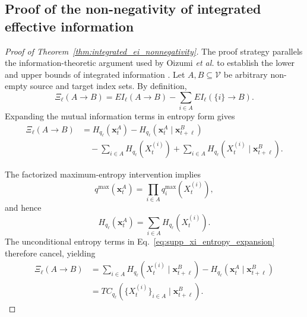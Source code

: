 \subsection{Proof of the non-negativity of integrated effective information}
\label{app:proof_integrated_ei_nonnegativity}

\begin{proof}[Proof of Theorem~\ref{thm:integrated_ei_nonnegativity}]

The proof strategy parallels the information-theoretic argument used by
Oizumi \emph{et al.} to establish the lower and upper bounds of integrated
information \cite{Oizumi2016MeasuringII}. Let \(A,B\subseteq\mathcal{V}\) be arbitrary non-empty source and target index
sets. By definition,
\begin{equation}
    \Xi_{\ell}(A\rightarrow B)
    =
    EI_{\ell}(A\rightarrow B)
    -
    \sum_{i\in A}
    EI_{\ell}(\{i\}\rightarrow B).
    \label{eq:supp_xi_definition}
\end{equation}
Expanding the mutual information terms in entropy form gives
\begin{align}
    \Xi_{\ell}(A\rightarrow B)
    &=
    H_{q_{\ell}}
    \left(
        \boldsymbol{x}_{t}^{A}
    \right)
    -
    H_{q_{\ell}}
    \left(
        \boldsymbol{x}_{t}^{A}
        \mid
        \boldsymbol{x}_{t+\ell}^{B}
    \right)
    \nonumber\\
    &\quad-
    \sum_{i\in A}
    H_{q_{\ell}}
    \left(
        X_t^{(i)}
    \right)
    +
    \sum_{i\in A}
    H_{q_{\ell}}
    \left(
        X_t^{(i)}
        \mid
        \boldsymbol{x}_{t+\ell}^{B}
    \right).
    \label{eq:supp_xi_entropy_expansion}
\end{align}

The factorized maximum-entropy intervention implies
\begin{equation}
    q^{\max}
    \left(
        \boldsymbol{x}_{t}^{A}
    \right)
    =
    \prod_{i\in A}
    q_i^{\max}
    \left(
        X_t^{(i)}
    \right),
    \label{eq:supp_factorized_intervention}
\end{equation}
and hence
\begin{equation}
    H_{q_{\ell}}
    \left(
        \boldsymbol{x}_{t}^{A}
    \right)
    =
    \sum_{i\in A}
    H_{q_{\ell}}
    \left(
        X_t^{(i)}
    \right).
    \label{eq:supp_factorized_entropy}
\end{equation}
The unconditional entropy terms in
Eq.~\eqref{eq:supp_xi_entropy_expansion} therefore cancel, yielding
\begin{align}
    \Xi_{\ell}(A\rightarrow B)
    &=
    \sum_{i\in A}
    H_{q_{\ell}}
    \left(
        X_t^{(i)}
        \mid
        \boldsymbol{x}_{t+\ell}^{B}
    \right)
    -
    H_{q_{\ell}}
    \left(
        \boldsymbol{x}_{t}^{A}
        \mid
        \boldsymbol{x}_{t+\ell}^{B}
    \right)
    \nonumber\\
    &=
    TC_{q_{\ell}}
    \left(
        \{X_t^{(i)}\}_{i\in A}
        \mid
        \boldsymbol{x}_{t+\ell}^{B}
    \right).
    \label{eq:supp_xi_conditional_tc}
\end{align}


\end{proof}
